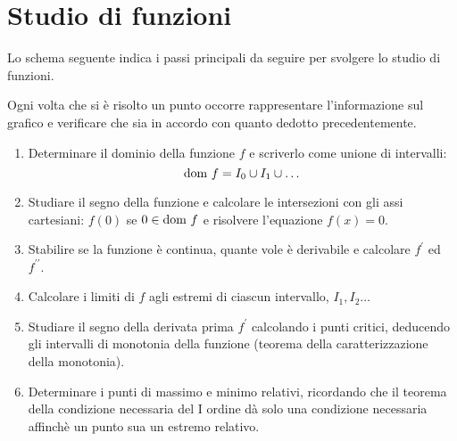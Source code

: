 
\chapter{Studio di funzioni} %

\label{ch:studio-di-funzioni} %

Lo schema seguente indica i passi principali da seguire per svolgere lo studio di funzioni.

Ogni volta che si è risolto un punto occorre rappresentare l'informazione sul grafico e verificare che sia in accordo con quanto dedotto precedentemente.

\begin{enumerate}
\item Determinare il dominio della funzione $f$ e scriverlo come unione di intervalli:
\[\text{dom } f = I_0 \cup I_1 \cup \dots \]

\item Studiare il segno della funzione e calcolare le intersezioni con gli assi cartesiani: $f(0)$ se $0\in\text{dom } f$ e risolvere l'equazione $f(x)=0$.

\item Stabilire se la funzione è continua, quante vole è derivabile e calcolare $f^\prime$ ed $f^{\prime\prime}$.

\item Calcolare i limiti di $f$ agli estremi di ciascun intervallo, $I_1, I_2 \dots$

\item Studiare il segno della derivata prima $f^\prime$ calcolando i punti critici, deducendo gli intervalli di monotonia della funzione (teorema della caratterizzazione della monotonia).

\item Determinare i punti di massimo e minimo relativi, ricordando che il teorema della condizione necessaria del I ordine dà solo una condizione necessaria affinchè un punto sua un estremo relativo.
\end{enumerate}

